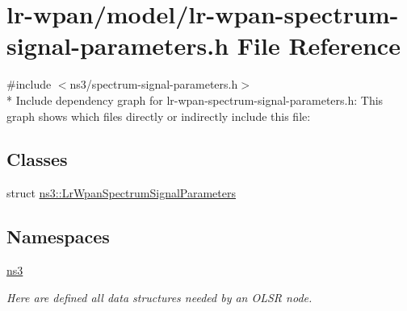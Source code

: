 \hypertarget{lr-wpan-spectrum-signal-parameters_8h}{}\section{lr-\/wpan/model/lr-\/wpan-\/spectrum-\/signal-\/parameters.h File Reference}
\label{lr-wpan-spectrum-signal-parameters_8h}
{\ttfamily \#include $<$ns3/spectrum-\/signal-\/parameters.\+h$>$}\\*
Include dependency graph for lr-\/wpan-\/spectrum-\/signal-\/parameters.h\+:
This graph shows which files directly or indirectly include this file\+:
\subsection*{Classes}
\begin{DoxyCompactItemize}
\item 
struct \hyperlink{structns3_1_1LrWpanSpectrumSignalParameters}{ns3\+::\+Lr\+Wpan\+Spectrum\+Signal\+Parameters}
\end{DoxyCompactItemize}
\subsection*{Namespaces}
\begin{DoxyCompactItemize}
\item 
 \hyperlink{namespacens3}{ns3}
\begin{DoxyCompactList}\small\item\em Here are defined all data structures needed by an O\+L\+SR node. \end{DoxyCompactList}\end{DoxyCompactItemize}
